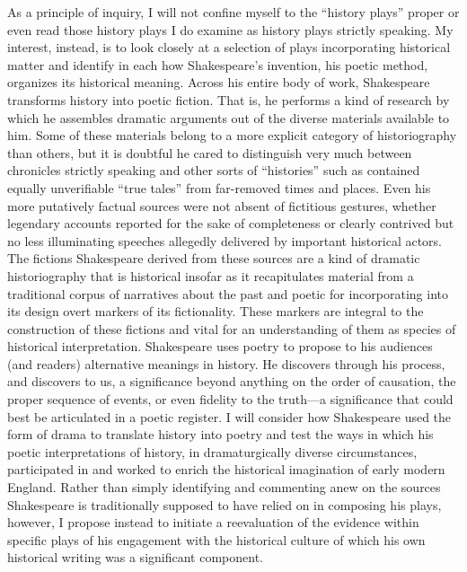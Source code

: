 As a principle of inquiry, I will not confine myself to the ``history plays'' proper or even read those history plays I do examine as history plays strictly speaking. My interest, instead, is to look closely at a selection of plays incorporating historical matter and identify in each how Shakespeare's invention, his poetic method, organizes its historical meaning. Across his entire body of work, Shakespeare transforms history into poetic fiction. That is, he performs a kind of research by which he assembles dramatic arguments out of the diverse materials available to him. Some of these materials belong to a more explicit category of historiography than others, but it is doubtful he cared to distinguish very much between chronicles strictly speaking and other sorts of ``histories'' such as contained equally unverifiable ``true tales'' from far-removed times and places. Even his more putatively factual sources were not absent of fictitious gestures, whether legendary accounts reported for the sake of completeness or clearly contrived but no less illuminating speeches allegedly delivered by important historical actors. The fictions Shakespeare derived from these sources are a kind of dramatic historiography that is historical insofar as it recapitulates material from a traditional corpus of narratives about the past and poetic for incorporating into its design overt markers of its fictionality. These markers are integral to the construction of these fictions and vital for an understanding of them as species of historical interpretation. Shakespeare uses poetry to propose to his audiences (and readers) alternative meanings in history. He discovers through his process, and discovers to us, a significance beyond anything on the order of causation, the proper sequence of events, or even fidelity to the truth---a significance that could best be articulated in a poetic register. I will consider how Shakespeare used the form of drama to translate history into poetry and test the ways in which his poetic interpretations of history, in dramaturgically diverse circumstances, participated in and worked to enrich the historical imagination of early modern England. Rather than simply identifying and commenting anew on the sources Shakespeare is traditionally supposed to have relied on in composing his plays, however, I propose instead to initiate a reevaluation of the evidence within specific plays of his engagement with the historical culture of which his own historical writing was a significant component.

